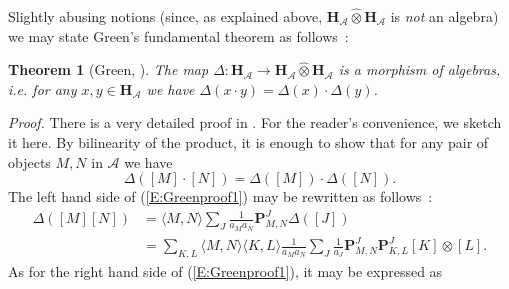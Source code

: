 \documentclass[a4paper,10pt]{amsart}
\def\H{\mathbf{H}}
\def\A{\mathcal{A}}
\newtheorem{theo}{\bf{Theorem}}[section]
\numberwithin{equation}{section}
\begin{document}
\vspace{.1in}

Slightly abusing notions (since, as explained above, $\H_{\A} \widehat{\otimes} \H_{\A}$ is \textit{not} an algebra) we may state Green's fundamental theorem as follows~:

\begin{theo}[Green, \cite{Green}] The map $\Delta: \H_{\A} \to \H_{\A} \widehat{\otimes} \H_{\A}$ is a morphism of algebras, i.e. for any $x, y \in \H_{\A}$ we have $\Delta(x\cdot y)=\Delta(x) \cdot \Delta(y)$.\end{theo}
\noindent
\textit{Proof.}  There is a very detailed proof in \cite{RingelGreen}. For the reader's convenience, we sketch it here. By bilinearity of the product, it is enough to show that for any pair of objects $M,N$ in $\A$ we have
\begin{equation}\label{E:Greenproof1}
\Delta([M] \cdot [N])=\Delta([M]) \cdot \Delta([N]).
\end{equation}
The left hand side of (\ref{E:Greenproof1}) may be rewritten as follows~:
\begin{equation*}
\begin{split}
\Delta([M][N])&= \langle M, N \rangle \sum_J \frac{1}{a_M a_N} \mathbf{P}_{M,N}^J \Delta([J])\\
&=\sum_{K,L} \langle M,N \rangle \langle K,L \rangle \frac{1}{a_Ma_N} \sum_J \frac{1}{a_J} \mathbf{P}^J_{M,N} \mathbf{P}^J_{K,L} [K] \otimes [L].
\end{split}
\end{equation*}
As for the right hand side of (\ref{E:Greenproof1}), it may be expressed as
\end{document}
